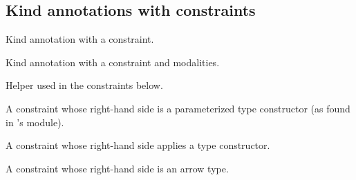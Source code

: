 \subsection{Kind annotations with  constraints\label{Oxcaml--kind-annotations-with-with-constraints}}%
\label{Oxcaml--type-t_with}\begin{ocamlindent}Kind annotation with a  constraint.\end{ocamlindent}%
\medbreak
\label{Oxcaml--type-t_with_modalities}\begin{ocamlindent}Kind annotation with a  constraint and modalities.\end{ocamlindent}%
\medbreak
\label{Oxcaml--type-comparator}\begin{ocamlindent}Helper used in the  constraints below.\end{ocamlindent}%
\medbreak
\label{Oxcaml--type-t_with_constr}\begin{ocamlindent}A  constraint whose right-hand side is a parameterized type constructor (as found in 's  module).\end{ocamlindent}%
\medbreak
\label{Oxcaml--type-t_with_app}\begin{ocamlindent}A  constraint whose right-hand side applies a type constructor.\end{ocamlindent}%
\medbreak
\label{Oxcaml--type-t_with_arrow}\begin{ocamlindent}A  constraint whose right-hand side is an arrow type.\end{ocamlindent}%
